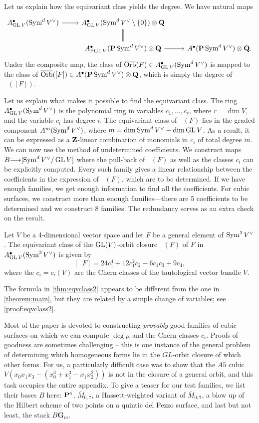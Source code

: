 \documentclass[12pt,reqno]{amsart}
\DeclareMathOperator{\Orb}{\overline{Orb}}
\renewcommand{\to}{{\longrightarrow}}
\numberwithin{equation}{section}
\newcommand{\G}{\mathbf G}
\begin{document}
Let us explain how the equivariant class yields the degree.
We have natural maps
\[
\begin{tikzcd}
  A^\bullet_{\GL V}(\Sym^dV^\vee) \ar{r}& A^\bullet_{\GL V}(\Sym^d V^\vee \setminus
  \{0\}) \otimes \Q \ar[equal]{d}\\
  &A^\bullet_{\PGL V}(\P \Sym^dV^\vee) \otimes \Q \ar{r}&
  A^\bullet(\P \Sym^dV^\vee) \otimes \Q.
\end{tikzcd}
\]
Under the composite map, the class of $\Orb(F) \in A^\bullet_{\GL
  V}(\Sym^dV^\vee)$ is mapped to the class of $\Orb([F]) \in
A^\bullet(\P \Sym^dV^\vee) \otimes \Q$, which is simply the degree of $\Orb([F])$.

Let us explain what makes it possible to find the equivariant
class.  The ring $A^\bullet_{\GL V}(\Sym^dV^\vee)$ is the polynomial ring
in variables $c_1, \dots, c_r$, where $r = \dim V$, and the variable
$c_i$ has degree $i$.  The equivariant class of $\Orb(F)$ lies in the
graded component $A^m(\Sym^dV^\vee)$, where
$m = \dim \Sym^d V^\vee - \dim \GL V$.  As a result, it can be expressed as
a $\Z$-linear combination of monomials in $c_i$ of total degree
$m$. We can now use the method of undetermined coefficients.  We
construct maps $B \to [\Sym^dV^\vee/\GL V]$ where the pull-back of
$\Orb(F)$ as well as the classes $c_i$ can be explicitly
computed. Every such family gives a linear relationship between the
coefficients in the expression of $\Orb(F)$, which are to be determined.
If we have enough families, we get enough information to find all the coefficients.
For cubic surfaces, we construct more than enough families---there are 5
coefficients to be determined and we construct 8 families. The redundancy
serves as an extra check on the result.
\begin{theorem}\label{thm:eqvclass2}
  Let $V$ be a 4-dimensional vector space and let $F$ be a general
  element of $\Sym^3 V^\vee$.
  The equivariant class of the $\GL(V)$-orbit closure $\Orb(F)$ of $F$
  in $A^\bullet_{\GL V}(\Sym^3 V^\vee)$ is given by
  \[
    [\Orb F] = 24c_1^4 + 12c_1^2c_2 - 6c_1c_3 + 9c_4,
  \]
  where the \(c_i = c_i(V)\) are the Chern classes of the tautological vector
  bundle $V$.
\end{theorem}
The formula in \autoref{thm:eqvclass2} appears to be different from the one
in \autoref{theorem:main}, but they are related by a simple change of
variables; see \autoref{proof:eqvclass2}.

Most of the paper is devoted to constructing {\sl provably} good
families of cubic surfaces on which we can compute $\deg \mu$ and the
Chern classes $c_i$.  Proofs of goodness are sometimes challenging --
this is one instance of the general problem of determining which
homogeneous forms lie in the $GL$-orbit closure of which other forms.
For us, a particularly difficult case was to show that the $A5$ cubic
$V(x_0 x_1 x_3 - (x_0^3 + x_1^3 - x_1x_{2}^2))$ is not in the closure
of a general orbit, and this task occupies the entire appendix. To give a teaser for our test families, we list their
bases $B$ here: $\P^4$, $\overline M_{0,7}$, a
Hassett-weighted variant of $\overline M_{0,7}$, a blow up of the
Hilbert scheme of two points on a quintic del Pezzo surface, and last
but not least, the stack $B\G_m$.
\end{document}
